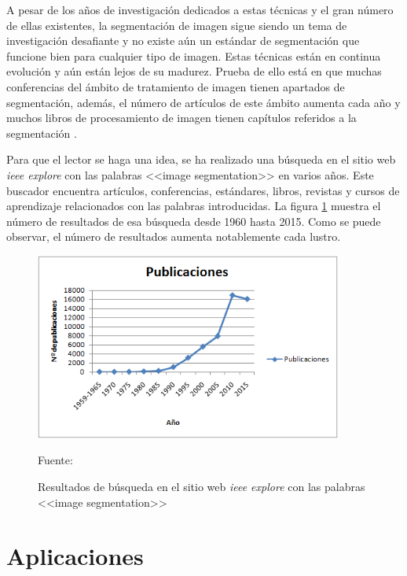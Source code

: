 A pesar de los a\~{n}os de investigaci\'{o}n dedicados a estas t\'{e}cnicas y el gran n\'{u}mero de ellas existentes, la segmentaci\'{o}n de imagen sigue siendo un tema de investigaci\'{o}n desafiante y no existe a\'{u}n un est\'{a}ndar de segmentaci\'{o}n que funcione bien para cualquier tipo de imagen. Estas t\'{e}cnicas est\'{a}n en continua evoluci\'{o}n y a\'{u}n est\'{a}n lejos de su madurez. Prueba de ello est\'{a} en que muchas conferencias del \'{a}mbito de tratamiento de imagen tienen apartados de segmentaci\'{o}n, adem\'{a}s, el n\'{u}mero de art\'{i}culos de este \'{a}mbito aumenta cada a\~{n}o y muchos libros de procesamiento de imagen tienen cap\'{i}tulos referidos a la segmentaci\'{o}n \cite{zhang1}.

Para que el lector se haga una idea, se ha realizado una b\'{u}squeda en el sitio web \textit{ieee explore}\cite{ieee1} con las palabras <<image segmentation>> en varios a\~{n}os. Este buscador encuentra art\'{i}culos, conferencias, est\'{a}ndares, libros, revistas y cursos de aprendizaje relacionados con las palabras introducidas. La figura \ref{regisIEEE} muestra el n\'{u}mero de resultados de esa b\'{u}squeda desde 1960 hasta 2015. Como se puede observar, el n\'{u}mero de resultados aumenta notablemente cada lustro.	
	
\begin{figure}[ht]
	\centering
	\includegraphics[width=0.9\textwidth]{./imagenes/publicaciones}
	\captionsetup{justification=centering}
	\caption{Resultados de b\'{u}squeda en el sitio web \textit{ieee explore} \cite{ieee1} con las palabras <<image segmentation>> }
	\vspace{2 mm}			
	Fuente: \cite{ieee1}
	\label{regisIEEE}
\end{figure}
 
\section{Aplicaciones}

